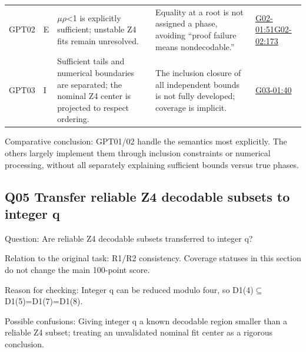 \documentclass[11pt,a4paper]{article}
\begin{document}
{\begin{longtable}
{}GPT02 & E & \ensuremath{\mu}\ensuremath{\rho}<1 is explicitly sufficient; unstable Z4 fits remain unresolved. & Equality at a root is not assigned a phase,\allowbreak{} avoiding “proof failure means nondecodable.” & \hyperref[src:G02-01]{G02-01:51}\newline \hyperref[src:G02-02]{G02-02:173}\tabularnewline
{}GPT03 & I & Sufficient tails and numerical boundaries are separated; the nominal Z4 center is projected to respect ordering. & The inclusion closure of all independent bounds is not fully developed; coverage is implicit. & \hyperref[src:G03-01]{G03-01:40}\tabularnewline
\bottomrule
\end{longtable}
}
Comparative conclusion: GPT01/\allowbreak{}02 handle the semantics most explicitly. The others largely implement them through inclusion constraints or numerical processing,\allowbreak{} without all separately explaining sufficient bounds versus true phases.

\clearpage
\subsection{Q05 Transfer reliable Z4 decodable subsets to integer q}
\label{aspect:Q05}
Question: Are reliable Z4 decodable subsets transferred to integer q?

Relation to the original task: R1/\allowbreak{}R2 consistency. Coverage statuses in this section do not change the main 100-point score.

Reason for checking: Integer q can be reduced modulo four,\allowbreak{} so D1(4)\ensuremath{\subseteq}D1(5)=D1(7)=D1(8).

Possible confusions: Giving integer q a known decodable region smaller than a reliable Z4 subset; treating an unvalidated nominal fit center as a rigorous conclusion.
\end{document}
